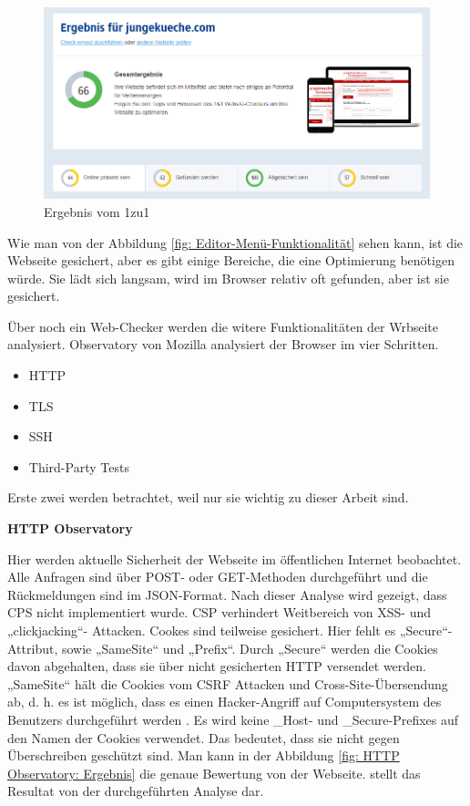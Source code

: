 \begin{figure}[h]
	\centering
	\includegraphics[width=1\linewidth]{Graphics/egebnis1to1.png}
	\caption[Egebniss Von 1zu1]{Ergebnis vom 1zu1}
	\label{fig: Egebniss Von 1zu1}
\end{figure}

Wie man von der Abbildung \ref{fig: Editor-Menü-Funktionalität} sehen kann, ist die Webseite gesichert, aber es gibt einige Bereiche, die eine Optimierung benötigen würde. Sie lädt sich langsam, wird im Browser relativ oft gefunden, aber ist sie gesichert. 

Über noch ein Web-Checker werden die witere Funktionalitäten der Wrbseite analysiert. Observatory\cite[postnote]{bentley:1999} von Mozilla analysiert der Browser im vier Schritten. 

\begin{itemize}	
	\item \ac{HTTP}
	\item \ac{TLS}
	\item \ac{SSH}
	\item \ac{Third-Party Tests}
\end{itemize}

Erste zwei werden betrachtet, weil nur sie wichtig zu dieser Arbeit sind.

\pagebreak

\textbf{HTTP Observatory}

Hier werden aktuelle Sicherheit der Webseite im öffentlichen Internet beobachtet. Alle Anfragen sind über POST- oder GET-Methoden durchgeführt und die Rückmeldungen sind im JSON-Format.
Nach dieser Analyse wird gezeigt, dass \ac{CPS} nicht implementiert wurde. CSP verhindert Weitbereich von \ac{XSS}- und „clickjacking“- Attacken. 
Cookes sind teilweise gesichert. Hier fehlt es „Secure“-Attribut, sowie „SameSite“ und „Prefix“.  Durch „Secure“ werden die Cookies davon abgehalten, dass sie über nicht gesicherten HTTP versendet werden. „SameSite“ hält die Cookies vom \ac{CSRF} Attacken und Cross-Site-Übersendung ab, d. h. es ist möglich, dass es einen Hacker-Angriff auf Computersystem des Benutzers durchgeführt werden \cite[postnote]{bentley:1999}
. Es wird keine \_Host- und \_Secure-Prefixes auf den Namen der Cookies verwendet. Das bedeutet, dass sie nicht gegen Überschreiben geschützt sind. Man kann in der Abbildung \ref{fig: HTTP Observatory: Ergebnis} die genaue Bewertung von der Webseite.
 stellt das Resultat von der durchgeführten Analyse dar.
 
